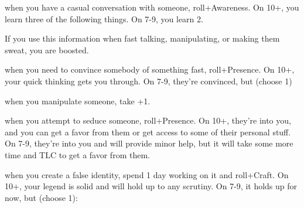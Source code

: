 \begin{dossier}
\hspace{.5cm}%
\vrule width 2pt
\hspace{.3cm}%
\begin{dossiermovebar}
\fontsize{8.5pt}{1em}\selectfont
\setlength{\parskip}{.05cm}


 when you have a casual conversation with someone, roll+Awareness. On
10+, you learn three of the following things. On
7-9, you learn 2.
\begin{moveoptions}




\end{moveoptions}
If you use this information when fast talking, manipulating, or making them sweat, you are
boosted.

 when you need to convince somebody of something fast, roll+Presence. On
10+, your quick thinking gets you through. On 7-9,
they’re convinced, but (choose 1)

\begin{moveoptions}


\end{moveoptions}

 when
you manipulate someone, take +1.

 when you attempt to seduce someone, roll+Presence. On 10+, they’re
into you, and you can get a favor from them or get access to some of their personal stuff.
On 7-9, they’re into you and will provide minor help, but it will take some more time and
TLC to get a favor from them.

 when you create a false identity, spend 1 day working on it and
roll+Craft. On 10+, your legend is solid and will hold up to any scrutiny. On 7-9, it holds up
for now, but (choose 1):

\begin{moveoptions}


\end{moveoptions}
\end{dossiermovebar}
\end{dossier}
